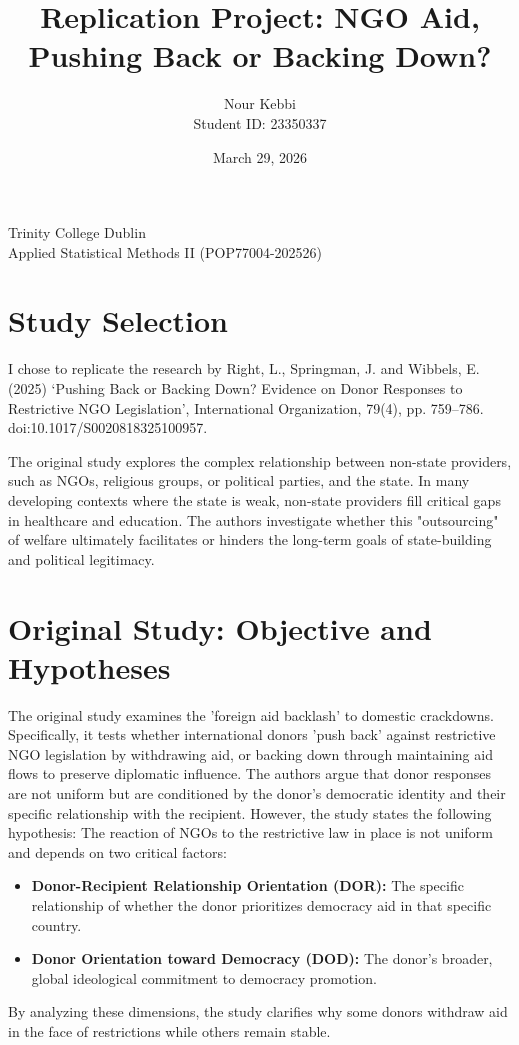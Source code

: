 \documentclass[12pt, a4paper]{article}
\title{Replication Project: NGO Aid, Pushing Back or Backing Down?}
\author{Nour Kebbi \\ Student ID: 23350337}
\date{March 29, 2026}
\begin{document}
\maketitle
\begin{center}
    Trinity College Dublin \\
    Applied Statistical Methods II (POP77004-202526)
\end{center}

\section{Study Selection}
I chose to replicate the research by Right, L., Springman, J. and Wibbels, E. (2025) ‘Pushing Back or Backing Down? Evidence on Donor Responses to Restrictive NGO Legislation’, International Organization, 79(4), pp. 759–786. doi:10.1017/S0020818325100957.

The original study explores the complex relationship between non-state providers, such as NGOs, religious groups, or political parties, and the state. In many developing contexts where the state is weak, non-state providers fill critical gaps in healthcare and education. The authors investigate whether this "outsourcing" of welfare ultimately facilitates or hinders the long-term goals of state-building and political legitimacy.

\section{Original Study: Objective and Hypotheses}
The original study examines the 'foreign aid backlash' to domestic crackdowns. Specifically, it tests whether international donors 'push back' against restrictive NGO legislation by withdrawing aid, or backing down through maintaining aid flows to preserve diplomatic influence. The authors argue that donor responses are not uniform but are conditioned by the donor's democratic identity and their specific relationship with the recipient.
However, the study states the following hypothesis: The reaction of NGOs to the restrictive law in place is not uniform and depends on two critical factors:
\begin{itemize}
    \item \textbf{Donor-Recipient Relationship Orientation (DOR):} The specific relationship of whether the donor prioritizes democracy aid in that specific country.
    \item \textbf{Donor Orientation toward Democracy (DOD):} The donor’s broader, global ideological commitment to democracy promotion.
\end{itemize}
By analyzing these dimensions, the study clarifies why some donors withdraw aid in the face of restrictions while others remain stable.
\end{document}
